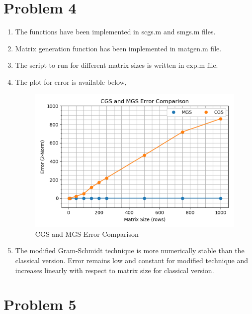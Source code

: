 \documentclass[12pt,letterpaper]{article}
\begin{document}
\section*{Problem 4}

\begin{enumerate}
	\item The functions have been implemented in scgs.m and smgs.m files.
	\item Matrix generation function has been implemented in matgen.m file.
	\item The script to run for different matrix sizes is written in exp.m file.
	\item The plot for error is available below,
	\begin{figure}[!h]
		\centering
		\includegraphics[width=0.9\linewidth]{1.png}
		\caption{CGS and MGS Error Comparison}
	\end{figure}
	\item The modified Gram-Schmidt technique is more numerically stable than the classical version. Error remains low and constant for modified technique and increases linearly with respect to matrix size for classical version.
\end{enumerate}

\section*{Problem 5}

   
\end{document}
